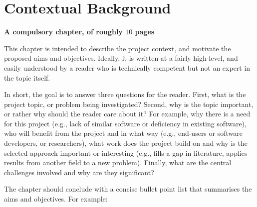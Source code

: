 \documentclass[ %
                    author={Luke Murray},
                supervisor={Dr. Simon Hollis},
                     title={Shadow Peer-to-Peer Networks},
                  subtitle={},
                    degree={MEng},
                      year={2013} ]{thesis}
\begin{document}

%

\mainmatter


\chapter{Contextual Background}
\label{chap:context}

{\bf A compulsory chapter, of roughly $10$ pages}
\vspace{1cm} 

\noindent
This chapter is intended to describe the project context, and motivate
the proposed aims and objectives.  Ideally, it is written at a fairly 
high-level, and easily understood by a reader who is technically 
competent but not an expert in the topic itself.

In short, the goal is to answer three questions for the reader.  First, 
what is the project topic, or problem being investigated?  Second, why 
is the topic important, or rather why should the reader care about it?  
For example, why there is a need for this project (e.g., lack of similar 
software or deficiency in existing software), who will benefit from the 
project and in what way (e.g., end-users or software developers, or 
researchers), what work does the project build on and why is the selected 
approach important or interesting (e.g., fills a gap in literature, applies
results from another field to a new problem).  Finally, what are the 
central challenges involved and why are they significant? 
 
The chapter should conclude with a concise bullet point list that 
summarises the aims and objectives.  For example:
\end{document}
